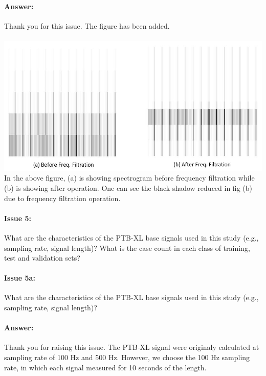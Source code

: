 \documentclass{article}
\begin{document}
\paragraph{Answer:}
Thank you for this issue. The figure has been added.\\\\
\includegraphics[scale=0.5]{before and after spectrogram.JPG}\\
In the above figure, (a) is showing spectrogram before frequency filtration while (b) is showing after operation. One can see the black shadow reduced in fig (b) due to frequency filtration operation. 

\paragraph{Issue 5:}
\begin{displayquote}
What are the characteristics of the PTB-XL base signals used in this study (e.g., sampling rate, signal length)? What is the case count in each class of training, test and validation sets?
\end{displayquote}

\paragraph{Issue 5a:}
\begin{displayquote}
What are the characteristics of the PTB-XL base signals used in this study (e.g., sampling rate, signal length)? 
\end{displayquote}

\paragraph{Answer:}
Thank you for raising this issue. The PTB-XL signal were originaly calculated at sampling rate of 100 Hz and 500 Hz. However, we choose the 100 Hz sampling rate, in which each signal measured for 10 seconds of the length. 
\end{document}
